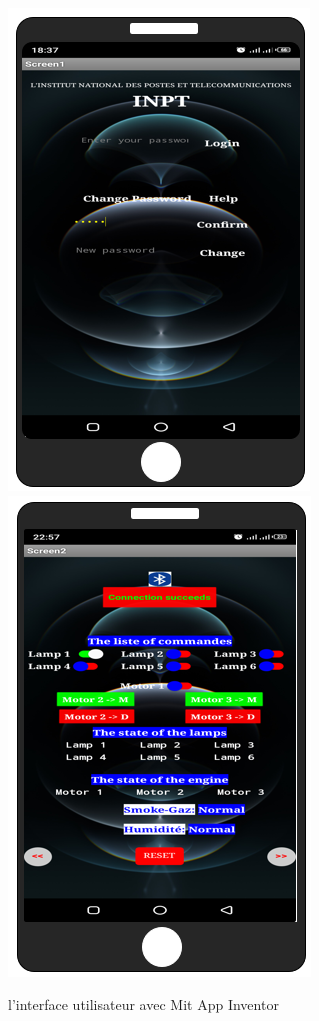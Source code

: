 \begin{flushleft}
					\begin{figure}[h]
						\centering
						\includegraphics{chapitres/images/Fenetre1.PNG}
						\includegraphics{chapitres/images/Fenetre2.PNG}
						\caption{l'interface utilisateur avec Mit App Inventor}
						\label{fig:labelname}
					\end{figure}

\end{flushleft}
